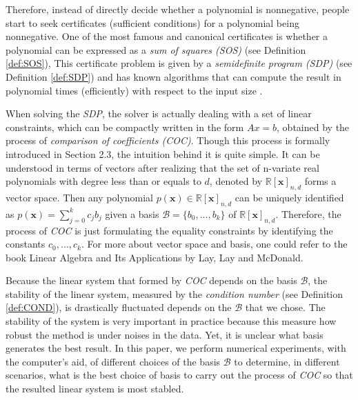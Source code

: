 \documentclass[12pt]{amsart}
\numberwithin{equation}{section}
\theoremstyle{definition}
\numberwithin{thm}{section}
\begin{document}
Therefore, instead of directly decide whether a polynomial is nonnegative, people start to seek certificates (sufficient conditions) for a polynomial being nonnegative.
One of the most famous and canonical certificates is whether a polynomial can be expressed as a \emph{sum of squares (SOS)} (see Definition \ref{def:SOS}),
This certificate problem is given by a \emph{semidefinite program (SDP)} (see Definition \ref{def:SDP}) and
has known algorithms that can compute the result in polynomial times (efficiently) with respect to the input size \cite{Blekherman:Parrilo:Thomas}.


When solving the \emph{SDP}, the solver is actually dealing with a set of linear constraints, which can be compactly written in the form $Ax = b$, obtained by the process of \emph{comparison of coefficients (COC)}.
Though this process is formally introduced in Section 2.3, the intuition behind it is quite simple. 
It can be understood in terms of vectors after realizing that the set of n-variate real polynomials with degree less than or equals to $d$, denoted by $\mathbb{R}[\mathbf{x}]_{n, d}$ forms a vector space.
Then any polynomial $p(\mathbf{x}) \in \mathbb{R}[\mathbf{x}]_{n, d}$ can be uniquely identified as $p(\mathbf{x}) = \sum_{j = 0}^k c_j b_j$ given a basis $\mathcal{B} = \{b_0, ..., b_k\}$ of $\mathbb{R}[\mathbf{x}]_{n, d}$.
Therefore, the process of \emph{COC} is just formulating the equality constraints by identifying the constants $c_0, ..., c_k$.
For more about vector space and basis, one could refer to the book Linear Algebra and Its Applications by Lay, Lay and McDonald\cite{strang2006linear}.

Because the linear system that formed by \emph{COC} depends on the basis $\mathcal{B}$,
the stability of the linear system, measured by the \emph{condition number} (see Definition \ref{def:COND}), is drastically fluctuated depends on the $\mathcal{B}$ that we chose. 
The stability of the system is very important in practice because this measure how robust the method is under noises in the data.
Yet, it is unclear what basis generates the best result.
In this paper, we perform numerical experiments, with the computer's aid, of different choices of the basis $\mathcal{B}$ to determine, 
in different scenarios, what is the best choice of basis to carry out the process of \emph{COC} so that the resulted linear system is most stabled. 
\end{document}
